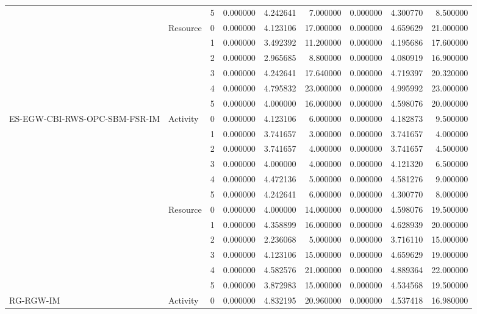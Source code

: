\begin{tabular}{lllrrrrrr}
 &  & 5 & 0.000000 & 4.242641 & 7.000000 & 0.000000 & 4.300770 & 8.500000 \\
\cline{2-3}
 & \multirow[c]{6}{*}{Resource} & 0 & 0.000000 & 4.123106 & 17.000000 & 0.000000 & 4.659629 & 21.000000 \\
 &  & 1 & 0.000000 & 3.492392 & 11.200000 & 0.000000 & 4.195686 & 17.600000 \\
 &  & 2 & 0.000000 & 2.965685 & 8.800000 & 0.000000 & 4.080919 & 16.900000 \\
 &  & 3 & 0.000000 & 4.242641 & 17.640000 & 0.000000 & 4.719397 & 20.320000 \\
 &  & 4 & 0.000000 & 4.795832 & 23.000000 & 0.000000 & 4.995992 & 23.000000 \\
 &  & 5 & 0.000000 & 4.000000 & 16.000000 & 0.000000 & 4.598076 & 20.000000 \\
\cline{1-3} \cline{2-3}
\multirow[c]{12}{*}{ES-EGW-CBI-RWS-OPC-SBM-FSR-IM} & \multirow[c]{6}{*}{Activity} & 0 & 0.000000 & 4.123106 & 6.000000 & 0.000000 & 4.182873 & 9.500000 \\
 &  & 1 & 0.000000 & 3.741657 & 3.000000 & 0.000000 & 3.741657 & 4.000000 \\
 &  & 2 & 0.000000 & 3.741657 & 4.000000 & 0.000000 & 3.741657 & 4.500000 \\
 &  & 3 & 0.000000 & 4.000000 & 4.000000 & 0.000000 & 4.121320 & 6.500000 \\
 &  & 4 & 0.000000 & 4.472136 & 5.000000 & 0.000000 & 4.581276 & 9.000000 \\
 &  & 5 & 0.000000 & 4.242641 & 6.000000 & 0.000000 & 4.300770 & 8.000000 \\
\cline{2-3}
 & \multirow[c]{6}{*}{Resource} & 0 & 0.000000 & 4.000000 & 14.000000 & 0.000000 & 4.598076 & 19.500000 \\
 &  & 1 & 0.000000 & 4.358899 & 16.000000 & 0.000000 & 4.628939 & 20.000000 \\
 &  & 2 & 0.000000 & 2.236068 & 5.000000 & 0.000000 & 3.716110 & 15.000000 \\
 &  & 3 & 0.000000 & 4.123106 & 15.000000 & 0.000000 & 4.659629 & 19.000000 \\
 &  & 4 & 0.000000 & 4.582576 & 21.000000 & 0.000000 & 4.889364 & 22.000000 \\
 &  & 5 & 0.000000 & 3.872983 & 15.000000 & 0.000000 & 4.534568 & 19.500000 \\
\cline{1-3} \cline{2-3}
\multirow[c]{12}{*}{RG-RGW-IM} & \multirow[c]{6}{*}{Activity} & 0 & 0.000000 & 4.832195 & 20.960000 & 0.000000 & 4.537418 & 16.980000 \\

\end{tabular}

